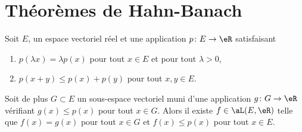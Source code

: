 
\section{Théorèmes de Hahn-Banach}

\begin{theorem}
    Soit \( E\), un espace vectoriel réel et une application \( p\colon E\to \eR\) satisfaisant
    \begin{enumerate}
        \item
            \( p(\lambda x)=\lambda p(x)\) pour tout \( x\in E\) et pour tout \( \lambda>0\),
        \item
            \( p(x+y)\leq p(x)+p(y)\) pour tout \( x,y\in E\).
    \end{enumerate}
    Soit de plus \( G\subset E\) un sous-espace vectoriel muni d'une application \( g\colon G\to \eR\) vérifiant \( g(x)\leq p(x)\) pour tout \( x\in G\). Alors il existe \( f\in\aL(E,\eR)\) telle que \( f(x)=g(x)\) pour tout \( x\in G\) et \( f(x)\leq p(x)\) pour tout \( x\in E\).
\end{theorem}


